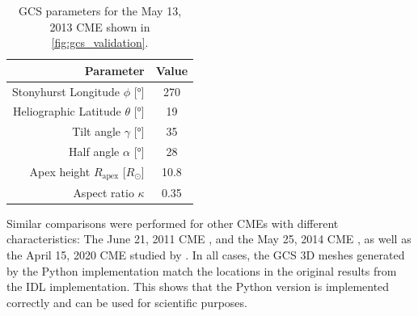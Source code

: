 \begin{table}
	\centering
	\begin{tabular}{rS[table-format=3.2]}
		\toprule
		                                  {Parameter} & {Value} \\ \midrule
		   Stonyhurst Longitude $\phi$ [\si{\degree}] & 270     \\
		Heliographic Latitude $\theta$ [\si{\degree}] & 19      \\
		           Tilt angle $\gamma$ [\si{\degree}] & 35      \\
		           Half angle $\alpha$ [\si{\degree}] & 28      \\
		      Apex height $R_\text{apex}$ [$R_\odot$] & 10.8    \\
		                        Aspect ratio $\kappa$ & 0.35    \\ \bottomrule
	\end{tabular}
	\caption[GCS parameters for \autoref{fig:gcs_validation}]{GCS parameters for the May 13, 2013 CME shown in \autoref{fig:gcs_validation}.}
	\label{tab:gcs_validation_params}
\end{table}

Similar comparisons were performed for other CMEs with different characteristics: The June 21, 2011 CME \citep[originally reconstructed by][Table 1]{Heinemann-2019}, and the May 25, 2014 CME \citep[originally reconstructed by][Figure 5b]{Dumbovic2018-ForbMod}, as well as the April 15, 2020 CME studied by \citet{Forstner-2021-SolO}. In all cases, the GCS 3D meshes generated by the Python implementation match the locations in the original results from the IDL implementation. This shows that the Python version is implemented correctly and can be used for scientific purposes.
